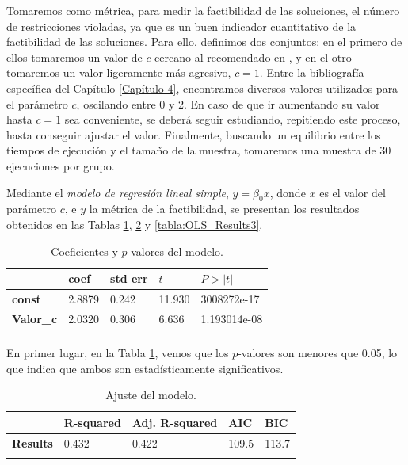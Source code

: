 \documentclass[12pt,a4paper]{book}
\begin{document}
Tomaremos como métrica, para medir la factibilidad de las soluciones, el número de restricciones violadas, ya que es un buen indicador cuantitativo de la factibilidad de las soluciones. Para ello, definimos dos conjuntos: en el primero de ellos tomaremos un valor de $c$ cercano al recomendado en \cite{yu_introduction_2010}, y en el otro tomaremos un valor ligeramente más agresivo, $c = 1$. Entre la bibliografía específica del Capítulo \ref{Capítulo 4}, encontramos diversos valores utilizados para el parámetro $c$, oscilando entre 0 y 2. En caso de que ir aumentando su valor hasta $c = 1$ sea conveniente, se deberá seguir estudiando, repitiendo este proceso, hasta conseguir ajustar el valor. Finalmente, buscando un equilibrio entre los tiempos de ejecución y el tamaño de la muestra, tomaremos una muestra de 30 ejecuciones por grupo. 

Mediante el \textsl{modelo de regresión lineal simple}, $y = \beta_0 x$, donde $x$ es el valor del parámetro $c$, e $y$ la métrica de la factibilidad, se presentan los resultados obtenidos en las Tablas \ref{tabla:OLS_Results1}, \ref{tabla:OLS_Results2} y \ref{tabla:OLS_Results3}.

\begin{longtable}[c]{l|l|l|l|l}
         & \textbf{coef}   & \textbf{std err} & $t$      & $ P > \vert t \vert $ \\ \hline
\endfirsthead
%
\endhead
%
\textbf{const}    & 2.8879 & 0.242   & 11.930 & 3008272e-17           \\ \hline
\textbf{Valor\_c} & 2.0320 & 0.306   & 6.636  & 1.193014e-08          \\ 
\caption{Coeficientes y $p$-valores del modelo.}
\label{tabla:OLS_Results1}\\
\end{longtable}

En primer lugar, en la Tabla \ref{tabla:OLS_Results1}, vemos que los $p$-valores son menores que 0.05, lo que indica que ambos son estadísticamente significativos.

\begin{longtable}[c]{l|l|l|l|l}

                 & \textbf{R-squared} & \textbf{Adj. R-squared} & \textbf{AIC} & \textbf{BIC} \\ \hline
\endfirsthead
%
\endhead
%
\textbf{Results} & 0.432              & 0.422                   & 109.5        & 113.7        \\ 
\caption{Ajuste del modelo.}
\label{tabla:OLS_Results2}\\
\end{longtable}
\end{document}
